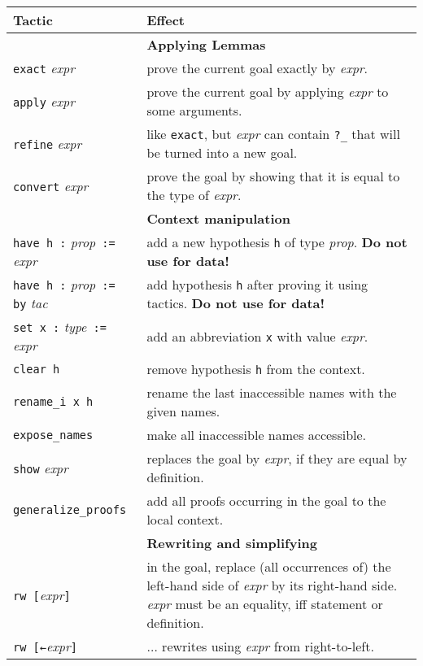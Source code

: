 \documentclass[a4paper]{article}
\newcommand{\lean}[1]{{\tt #1}}
\newcommand{\expr}[1][]{\textit{expr#1}\xspace}
\newcommand{\proposition}{\textit{prop}\xspace}
\newcommand{\tactic}[1][]{\textit{tac#1}\xspace} %
\newcommand{\type}{\textit{type}\xspace}
\newcommand{\warning}{\faWarning\xspace}
\begin{document}
\begin{center}
\setlength\tabcolsep{5mm}
\def\arraystretch{1.3}
\begin{longtable}{@{}lp{113mm}@{}}
  \toprule
  Tactic & Effect \\
  \midrule
  &\textbf{Applying Lemmas}\\
  \lean{exact} \expr & prove the current goal exactly by \expr. \\
  \lean{apply} \expr & prove the current goal by applying \expr to some arguments. \\
  \lean{refine} \expr & like \lean{exact}, but \expr can contain \lean{?\_} that will be turned into a new goal. \\
  \lean{convert} \expr & prove the goal by showing that it is equal to the type of \expr. \\
  \hline
  &\textbf{Context manipulation}\\
  \lean{have h :} \proposition\ \lean{:=} \expr & add a new hypothesis \lean{h} of type \proposition. \warning \textbf{Do not use for data!} \\
  \lean{have h :} \proposition\ \lean{:= by} \tactic & add hypothesis \lean{h} after proving it using tactics. \warning \textbf{Do not use for data!} \\
  \lean{set x :} \type\ \lean{:=} \expr & add an abbreviation \lean{x} with value \expr. \\
  \lean{clear h} & remove hypothesis \lean{h} from the context.\\
  \lean{rename\_i x h} & rename the last inaccessible names with the given names.\\
  \lean{expose\_names} & make all inaccessible names accessible.\\
  \lean{show} \expr & replaces the goal by \expr, if they are equal by definition.\\
  \lean{generalize\_proofs} & add all proofs occurring in the goal to the local context.\\
  \hline
  &\textbf{Rewriting and simplifying}\\
  \lean{rw [}\expr\lean{]} & in the goal, replace (all occurrences of) the left-hand side
  of \expr by its right-hand side. \expr must be an equality, iff statement or definition.\\
  \lean{rw [←}\expr\lean{]} & $\ldots$ rewrites using \expr from right-to-left. \\

\end{longtable}
\end{center}
\end{document}
